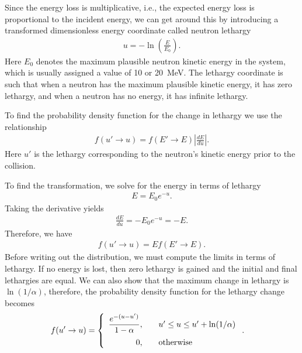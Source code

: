 Since the energy loss is multiplicative, i.e., the expected energy loss is proportional to the incident energy, we can get around this by introducing a transformed dimensionless energy coordinate called neutron lethargy
\begin{align}
  u = -\ln \left( \frac{E}{E_0} \right) .
\end{align}
Here $E_0$ denotes the maximum plausible neutron kinetic energy in the system, which is usually assigned a value of 10 or 20~MeV. The lethargy coordinate is such that when a neutron has the maximum plausible kinetic energy, it has zero lethargy, and when a neutron has no energy, it has infinite lethargy.

To find the probability density function for the change in lethargy we use the relationship
\begin{align}
  f(u' \rightarrow u) = f(E' \rightarrow E) \left| \frac{dE}{du} \right| .
\end{align}
Here $u'$ is the lethargy corresponding to the neutron's kinetic energy prior to the collision.

To find the transformation, we solve for the energy in terms of lethargy
\begin{align}
  E = E_0 e^{-u} . 
\end{align}
Taking the derivative yields
\begin{align}
  \frac{dE}{du} = - E_0 e^{-u} = -E . \nonumber
\end{align}
Therefore, we have
\begin{align}
  f(u' \rightarrow u) = E f(E' \rightarrow E) . \nonumber
\end{align}
Before writing out the distribution, we must compute the limits in terms of lethargy. If no energy is lost, then zero lethargy is gained and the initial and final lethargies are equal. We can also show that the maximum change in lethargy is $\ln(1/\alpha)$, therefore, the probability density function for the lethargy change becomes
\begin{align}
  f(u' \rightarrow u ) &= \left\{ \begin{array}{r l}
  \dfrac{e^{-(u - u')}}{1-\alpha} , & \quad u' \le u \le u' + \ln(1/\alpha) \vspace{0.2cm} \\
  0, & \quad \text{otherwise} \\ \end{array} \right. .
\end{align}

